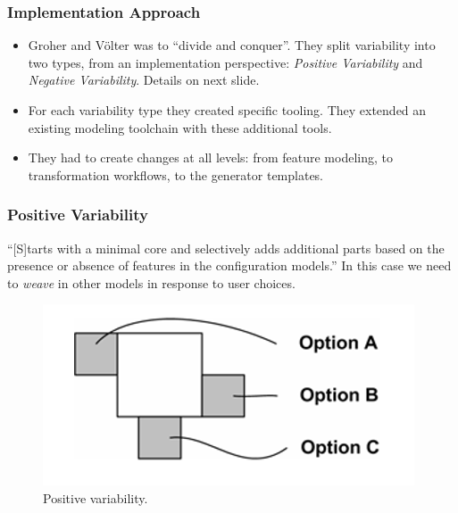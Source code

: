 \documentclass{beamer}
\begin{document}
\begin{frame}
\frametitle{Implementation Approach}

\begin{itemize}

\item Groher and V{\"o}lter was to \enquote{divide and conquer}. They
  split variability into two types, from an implementation
  perspective: \emph{Positive Variability} and \emph{Negative
    Variability}. Details on next slide.

  \pause{}

\item For each variability type they created specific tooling. They
  extended an existing modeling toolchain with these additional tools.

  \pause{}

  \item They had to create changes at all levels: from feature
    modeling, to transformation workflows, to the generator templates.

\end{itemize}

\end{frame}

\begin{frame}
\frametitle{Positive Variability}

\enquote{[S]tarts with a minimal core and selectively adds additional
  parts based on the presence or absence of features in the
  configuration models.}\cite{groher2007expressing} In this case we
need to \emph{weave} in other models in response to user choices.

\pause{}

\begin{figure}
  \centering
  \includegraphics[scale=0.3]{images/positive_variability_voelter.png}
  \caption{Positive variability.\cite{groher2007expressing}}
\end{figure}

\end{frame}
\end{document}
